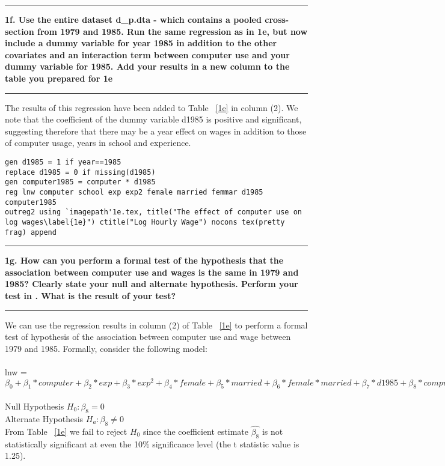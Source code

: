 \documentclass[12pt]{article}
\newcommand\question[1]{\vspace{1em}\hrule\vspace{1em}\textbf{#1}\vspace{1em}\hrule\vspace{1em}}
\begin{document}
\begin{table}
\caption{}

\end{table}

\question{1f. Use the entire dataset d\_p.dta - which contains a pooled cross-section from 1979 and 1985. Run the same regression as in 1e, but now include a dummy variable for year 1985 in addition to the other covariates and an interaction term between computer use and your dummy variable for 1985. Add your results in a new column to the table you prepared for 1e}
The results of this regression have been added to Table ~\ref{1e} in column (2). We note that the coefficient of the dummy variable d1985 is positive and significant, suggesting therefore that there may be a year effect on wages in addition to those of computer usage, years in school and experience.

\begin{lstlisting}
gen d1985 = 1 if year==1985
replace d1985 = 0 if missing(d1985)
gen computer1985 = computer * d1985
reg lnw computer school exp exp2 female married femmar d1985 computer1985
outreg2 using `imagepath'1e.tex, title("The effect of computer use on log wages\label{1e}") ctitle("Log Hourly Wage") nocons tex(pretty frag) append
\end{lstlisting}

\newpage
\question{1g. How can you perform a formal test of the hypothesis that the association between computer use and wages is the same in 1979 and 1985? Clearly state your null and alternate hypothesis. Perform your test in \stata. What is the result of your test?}
We can use the regression results in column (2) of Table ~\ref{1e} to perform a formal test of hypothesis of the association between computer use and wage between 1979 and 1985. Formally, consider the following model:\\\\
lnw = $\beta_0 + \beta_1 * computer + \beta_2 * exp + \beta_3 * exp^2 + \beta_4 * female + \beta_5 * married + \beta_6 * female * married + \beta_7 * d1985 + \beta_8 * computer * d1985 $ \\\\
Null Hypothesis $H_0: \beta_8  = 0$ \\ Alternate Hypothesis $H_a: \beta_8  \neq 0$\\

From  Table ~\ref{1e} we fail to reject $H_0$ since the coefficient estimate $\hat{\beta_8}$ is not statistically significant at even the 10\%  significance level (the t statistic value is 1.25).
\begin{lstlisting}
\end{lstlisting}
\end{document}
